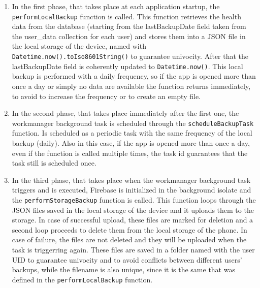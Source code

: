\begin{enumerate}[nosep] %
    \item In the first phase, that takes place at each application startup, the \newline \texttt{performLocalBackup} function is called. This function retrieves the health data from the database (starting from the lastBackupDate field taken from the user\_data collection for each user) and stores them into a JSON file in the local storage of the device, named with \texttt{Datetime.now().toIso8601String()} to guarantee univocity. After that the lastBackupDate field is coherently updated to \texttt{Datetime.now()}. This local backup is performed with a daily frequency, so if the app is opened more than once a day or simply no data are available the function returns immediately, to avoid to increase the frequency or to create an empty file.
    \item In the second phase, that takes place immediately after the first one, the workmanager background task is scheduled through the \texttt{scheduleBackupTask} function. Is scheduled as a periodic task with the same frequency of the local backup (daily). Also in this case, if the app is opened more than once a day, even if the function is called multiple times, the task id guarantees that the task still is scheduled once.
    \item In the third phase, that takes place when the workmanager background task triggers and is executed, Firebase is initialized in the background isolate and the \texttt{performStorageBackup} function is called. This function loops through the JSON files saved in the local storage of the device and it uploads them to the storage. In case of successful upload, these files are marked for deletion and a second loop proceeds to delete them from the local storage of the phone. In case of failure, the files are not deleted and they will be uploaded when the task is triggerring again. These files are saved in a folder named with the user UID to guarantee univocity and to avoid conflicts between different users' backups, while the filename is also unique, since it is the same that was defined in the \texttt{performLocalBackup} function.
\end{enumerate}

